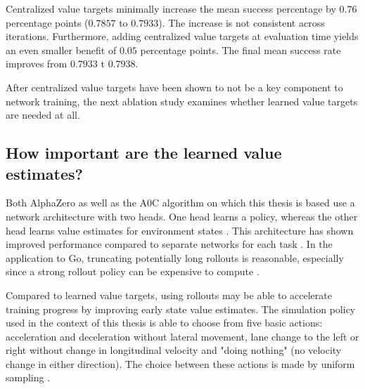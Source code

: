 Centralized value targets minimally increase the mean success percentage by $0.76$ percentage points ($0.7857$ to $0.7933$). The increase is not consistent across iterations. Furthermore, adding centralized value targets at evaluation time yields an even smaller benefit of $0.05$ percentage points. The final mean success rate improves from $0.7933$ t $0.7938$.

After centralized value targets have been shown to not be a key component to network training, the next ablation study examines whether learned value targets are needed at all.

\subsection{How important are the learned value estimates?}\label{ssec:eval_of_value_targets}
Both AlphaZero as well as the A0C algorithm on which this thesis is based use a network architecture with two heads. One head learns a policy, whereas the other head learns value estimates for environment states \cite{silverGeneralReinforcementLearning2018, moerlandA0CAlphaZero2018}. This architecture has shown improved performance compared to separate networks for each task \cite{silverMasteringGameGo2017}. In the application to Go, truncating potentially long rollouts is reasonable, especially since a strong rollout policy can be expensive to compute \cite{silverMasteringGameGo2016}.

Compared to learned value targets, using rollouts may be able to accelerate training progress by improving early state value estimates. The simulation policy used in the context of this thesis is able to choose from five basic actions: acceleration and deceleration without lateral movement, lane change to the left or right without change in longitudinal velocity and "doing nothing" (no velocity change in either direction). The choice between these actions is made by uniform sampling \cite{kurzerDecentralizedCooperativePlanning2018}.

